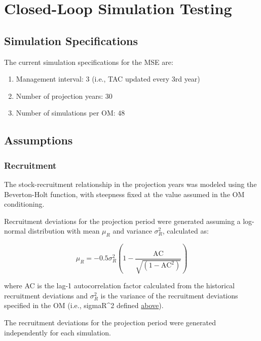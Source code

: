 \documentclass[
]{article}
\providecommand{\tightlist}{%
  \setlength{\itemsep}{0pt}\setlength{\parskip}{0pt}}
\begin{document}
\hypertarget{closed-loop-simulation-testing}{%
\section{Closed-Loop Simulation Testing}\label{closed-loop-simulation-testing}}

\hypertarget{simulation-specifications}{%
\subsection{Simulation Specifications}\label{simulation-specifications}}

The current simulation specifications for the MSE are:

\begin{enumerate}
\def\labelenumi{\arabic{enumi}.}
\tightlist
\item
  Management interval: 3 (i.e., TAC updated every 3rd year)
\item
  Number of projection years: 30
\item
  Number of simulations per OM: \(48\)
\end{enumerate}

\hypertarget{assumptions}{%
\subsection{Assumptions}\label{assumptions}}

\hypertarget{recruitment}{%
\subsubsection{Recruitment}\label{recruitment}}

The stock-recruitment relationship in the projection years was modeled using the Beverton-Holt function, with steepness fixed at the value assumed in the OM conditioning.

Recruitment deviations for the projection period were generated assuming a log-normal distribution with mean \(\mu_R\) and variance \(\sigma_R^2\), calculated as:

\[\mu_R = -0.5\sigma_R^2\left(1-\frac{\text{AC}}{\sqrt{(1-\text{AC}^2)}}\right)\]

where AC is the lag-1 autocorrelation factor calculated from the historical recruitment deviations and \(\sigma_R^2\) is the variance of the recruitment deviations specified in the OM (i.e., sigmaR\^{}2 defined \protect\hyperlink{om-conditioning}{above}).

The recruitment deviations for the projection period were generated independently for each simulation.
\end{document}
